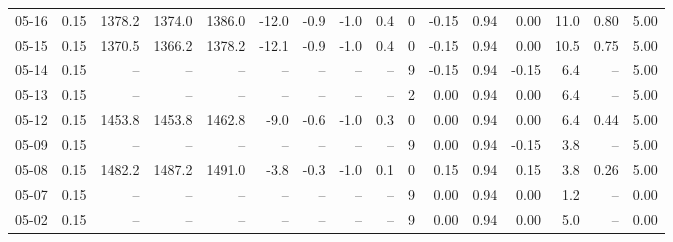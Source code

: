 \begin{threeparttable}
{\begin{tabular}{lrrrrrrrrrrrrrrr}
  05-16 &     0.15 & 1378.2 & 1374.0 & 1386.0 &      -12.0 &           -0.9 &                     -1.0 &                 0.4 &              0 &      -0.15 &      0.94 &           0.00 &             11.0 &            0.80 &                   5.00 \\
  05-15 &     0.15 & 1370.5 & 1366.2 & 1378.2 &      -12.1 &           -0.9 &                     -1.0 &                 0.4 &              0 &      -0.15 &      0.94 &           0.00 &             10.5 &            0.75 &                   5.00 \\
  05-14 &     0.15 &     -- &     -- &     -- &         -- &             -- &                       -- &                  -- &              9 &      -0.15 &      0.94 &          -0.15 &              6.4 &              -- &                   5.00 \\
  05-13 &     0.15 &     -- &     -- &     -- &         -- &             -- &                       -- &                  -- &              2 &       0.00 &      0.94 &           0.00 &              6.4 &              -- &                   5.00 \\
  05-12 &     0.15 & 1453.8 & 1453.8 & 1462.8 &       -9.0 &           -0.6 &                     -1.0 &                 0.3 &              0 &       0.00 &      0.94 &           0.00 &              6.4 &            0.44 &                   5.00 \\
  05-09 &     0.15 &     -- &     -- &     -- &         -- &             -- &                       -- &                  -- &              9 &       0.00 &      0.94 &          -0.15 &              3.8 &              -- &                   5.00 \\
  05-08 &     0.15 & 1482.2 & 1487.2 & 1491.0 &       -3.8 &           -0.3 &                     -1.0 &                 0.1 &              0 &       0.15 &      0.94 &           0.15 &              3.8 &            0.26 &                   5.00 \\
  05-07 &     0.15 &     -- &     -- &     -- &         -- &             -- &                       -- &                  -- &              9 &       0.00 &      0.94 &           0.00 &              1.2 &              -- &                   0.00 \\
  05-02 &     0.15 &     -- &     -- &     -- &         -- &             -- &                       -- &                  -- &              9 &       0.00 &      0.94 &           0.00 &              5.0 &              -- &                   0.00 \\

\end{tabular}}
\end{threeparttable}

